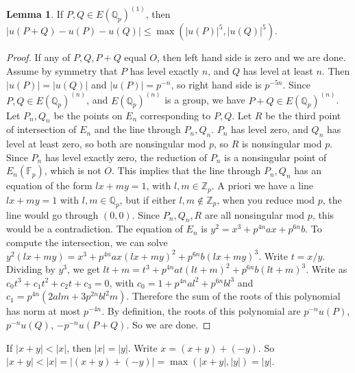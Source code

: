 \documentclass{article}
\newcommand{\F}{\mathbb{F}}
\newcommand{\Z}{\mathbb{Z}}
\newcommand{\Q}{\mathbb{Q}}
\newcommand{\rb}[1]{\left( #1 \right)}
\newcommand{\abs}[1]{\left\lvert #1 \right\rvert}
\theoremstyle{definition}\newtheorem{definition}{Definition}[section]
\theoremstyle{definition}\newtheorem{remark}[definition]{Remark}
\theoremstyle{definition}\newtheorem*{example}{Example}
\theoremstyle{definition}\newtheorem*{note}{Note}
\newtheorem{lemma}[definition]{Lemma}
\begin{document}
\begin{lemma}
\label{lem:7.5}
If $ P, Q \in E\rb{\Q_p}^{\rb{1}} $, then $ \abs{u\rb{P + Q} - u\rb{P} - u\rb{Q}} \le \max\rb{\abs{u\rb{P}}^5, \abs{u\rb{Q}}^5} $.
\end{lemma}

\begin{proof}
If any of $ P, Q, P + Q $ equal $ O $, then left hand side is zero and we are done. Assume by symmetry that $ P $ has level exactly $ n $, and $ Q $ has level at least $ n $. Then $ \abs{u\rb{P}} = \abs{u\rb{Q}} $ and $ \abs{u\rb{P}} = p^{-n} $, so right hand side is $ p^{-5n} $. Since $ P, Q \in E\rb{\Q_p}^{\rb{n}} $, and $ E\rb{\Q_p}^{\rb{n}} $ is a group, we have $ P + Q \in E\rb{\Q_p}^{\rb{n}} $. Let $ P_n, Q_n $ be the points on $ E_n $ corresponding to $ P, Q $. Let $ R $ be the third point of intersection of $ E_n $ and the line through $ P_n, Q_n $. $ P_n $ has level zero, and $ Q_n $ has level at least zero, so both are nonsingular mod $ p $, so $ R $ is nonsingular mod $ p $. Since $ P_n $ has level exactly zero, the reduction of $ P_n $ is a nonsingular point of $ E_n\rb{\F_p} $, which is not $ O $. This implies that the line through $ P_n, Q_n $ has an equation of the form $ lx + my = 1 $, with $ l, m \in \Z_p $. A priori we have a line $ lx + my = 1 $ with $ l, m \in \Q_p $, but if either $ l, m \notin \Z_p $, when you reduce mod $ p $, the line would go through $ \rb{0, 0} $. Since $ P_n, Q_n, R $ are all nonsingular mod $ p $, this would be a contradiction. The equation of $ E_n $ is $ y^2 = x^3 + p^{4n}ax + p^{6n}b $. To compute the intersection, we can solve $ y^2\rb{lx + my} = x^3 + p^{4n}ax\rb{lx + my}^2 + p^{6n}b\rb{lx + my}^3 $. Write $ t = x / y $. Dividing by $ y^3 $, we get $ lt + m = t^3 + p^{4n}at\rb{lt + m}^2 + p^{6n}b\rb{lt + m}^3 $. Write as $ c_0t^3 + c_1t^2 + c_2t + c_3 = 0 $, with $ c_0 = 1 + p^{4n}al^2 + p^{6n}bl^3 $ and $ c_1 = p^{4n}\rb{2alm + 3p^{2n}bl^2m} $. Therefore the sum of the roots of this polynomial has norm at most $ p^{-4n} $. By definition, the roots of this polynomial are $ p^{-n}u\rb{P} $, $ p^{-n}u\rb{Q} $, $ -p^{-n}u\rb{P + Q} $. So we are done.
\end{proof}


If $ \abs{x + y} < \abs{x} $, then $ \abs{x} = \abs{y} $. Write $ x = \rb{x + y} + \rb{-y} $. So $ \abs{x + y} < \abs{x} = \abs{\rb{x + y} + \rb{-y}} = \max\rb{\abs{x + y}, \abs{y}} = \abs{y} $.
\end{document}
